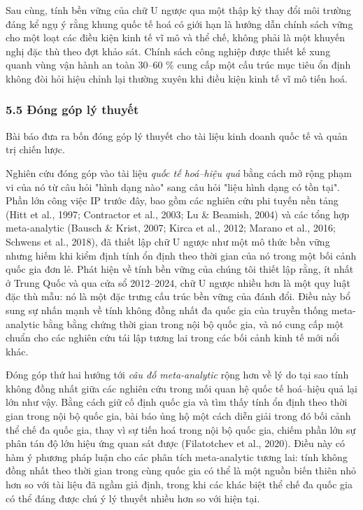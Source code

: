 \documentclass[12pt,a4paper]{article}
\begin{document}
Sau cùng, tính bền vững của chữ U ngược qua một thập kỷ thay đổi môi
trường đáng kể ngụ ý rằng khung quốc tế hoá có giới hạn là hướng dẫn
chính sách vững cho một loạt các điều kiện kinh tế vĩ mô và thể chế,
không phải là một khuyến nghị đặc thù theo đợt khảo sát. Chính sách công
nghiệp được thiết kế xung quanh vùng vận hành an toàn 30--60 \% cung cấp
một cấu trúc mục tiêu ổn định không đòi hỏi hiệu chỉnh lại thường xuyên
khi điều kiện kinh tế vĩ mô tiến hoá.

\hypertarget{55-ux111uxf3ng-guxf3p-luxfd-thuyux1ebft}{%
\subsubsection{5.5 Đóng góp lý
thuyết}\label{55-ux111uxf3ng-guxf3p-luxfd-thuyux1ebft}}

Bài báo đưa ra bốn đóng góp lý thuyết cho tài liệu kinh doanh quốc tế và
quản trị chiến lược.

Nghiên cứu đóng góp vào tài liệu \emph{quốc tế hoá--hiệu quả} bằng cách
mở rộng phạm vi của nó từ câu hỏi "hình dạng nào" sang câu hỏi "liệu
hình dạng có tồn tại". Phần lớn công việc IP trước đây, bao gồm các
nghiên cứu phi tuyến nền tảng (Hitt et al., 1997; Contractor et al.,
2003; Lu \& Beamish, 2004) và các tổng hợp meta-analytic (Bausch \&
Krist, 2007; Kirca et al., 2012; Marano et al., 2016; Schwens et al.,
2018), đã thiết lập chữ U ngược như một mô thức bền vững nhưng hiếm khi
kiểm định tính ổn định theo thời gian của nó trong một bối cảnh quốc gia
đơn lẻ. Phát hiện về tính bền vững của chúng tôi thiết lập rằng, ít nhất
ở Trung Quốc và qua cửa sổ 2012--2024, chữ U ngược nhiều hơn là một quy
luật đặc thù mẫu: nó là một đặc trưng cấu trúc bền vững của đánh đổi.
Điều này bổ sung sự nhấn mạnh về tính không đồng nhất đa quốc gia của
truyền thống meta-analytic bằng bằng chứng thời gian trong nội bộ quốc
gia, và nó cung cấp một chuẩn cho các nghiên cứu tái lập tương lai trong
các bối cảnh kinh tế mới nổi khác.

Đóng góp thứ hai hướng tới \emph{câu đố meta-analytic} rộng hơn về lý do
tại sao tính không đồng nhất giữa các nghiên cứu trong mối quan hệ quốc
tế hoá--hiệu quả lại lớn như vậy. Bằng cách giữ cố định quốc gia và tìm
thấy tính ổn định theo thời gian trong nội bộ quốc gia, bài báo ủng hộ
một cách diễn giải trong đó bối cảnh thể chế đa quốc gia, thay vì sự
tiến hoá trong nội bộ quốc gia, chiếm phần lớn sự phân tán độ lớn hiệu
ứng quan sát được (Filatotchev et al., 2020). Điều này có hàm ý phương
pháp luận cho các phân tích meta-analytic tương lai: tính không đồng
nhất theo thời gian trong cùng quốc gia có thể là một nguồn biến thiên
nhỏ hơn so với tài liệu đã ngầm giả định, trong khi các khác biệt thể
chế đa quốc gia có thể đáng được chú ý lý thuyết nhiều hơn so với hiện
tại.
\end{document}
